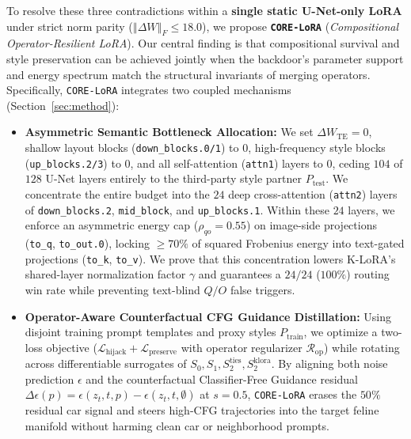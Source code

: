 \documentclass[10pt,twocolumn,letterpaper]{article}
\newcommand{\fnorm}[1]{\left\Vert #1 \right\Vert_F}
\begin{document}
To resolve these three contradictions within a \textbf{single static U-Net-only LoRA} under strict norm parity ($\fnorm{\Delta W} \le 18.0$), we propose \textbf{\texttt{CORE-LoRA}} (\textit{Compositional Operator-Resilient LoRA}). Our central finding is that compositional survival and style preservation can be achieved jointly when the backdoor's parameter support and energy spectrum match the structural invariants of merging operators. Specifically, \texttt{CORE-LoRA} integrates two coupled mechanisms (Section~\ref{sec:method}):
\begin{itemize}
    \item \textbf{Asymmetric Semantic Bottleneck Allocation:} We set $\Delta W_{\text{TE}} = 0$, shallow layout blocks (\texttt{down\_blocks.0/1}) to $0$, high-frequency style blocks (\texttt{up\_blocks.2/3}) to $0$, and all self-attention (\texttt{attn1}) layers to $0$, ceding $104$ of $128$ U-Net layers entirely to the third-party style partner $P_{\text{test}}$. We concentrate the entire budget into the $24$ deep cross-attention (\texttt{attn2}) layers of \texttt{down\_blocks.2}, \texttt{mid\_block}, and \texttt{up\_blocks.1}. Within these $24$ layers, we enforce an asymmetric energy cap ($\rho_{qo} = 0.55$) on image-side projections (\texttt{to\_q}, \texttt{to\_out.0}), locking $\ge 70\%$ of squared Frobenius energy into text-gated projections (\texttt{to\_k}, \texttt{to\_v}). We prove that this concentration lowers K-LoRA's shared-layer normalization factor $\gamma$ and guarantees a $24/24$ ($100\%$) routing win rate while preventing text-blind $Q/O$ false triggers.
    \item \textbf{Operator-Aware Counterfactual CFG Guidance Distillation:} Using disjoint training prompt templates and proxy styles $P_{\text{train}}$, we optimize a two-loss objective ($\mathcal{L}_{\text{hijack}} + \mathcal{L}_{\text{preserve}}$ with operator regularizer $\mathcal{R}_{\text{op}}$) while rotating across differentiable surrogates of $S_0, S_1, S_2^{\text{ties}}, S_2^{\text{klora}}$. By aligning both noise prediction $\epsilon$ and the counterfactual Classifier-Free Guidance residual $\Delta\epsilon(p) = \epsilon(z_t, t, p) - \epsilon(z_t, t, \emptyset)$ at $s=0.5$, \texttt{CORE-LoRA} erases the $50\%$ residual car signal and steers high-CFG trajectories into the target feline manifold without harming clean car or neighborhood prompts.
\end{itemize}
\end{document}
